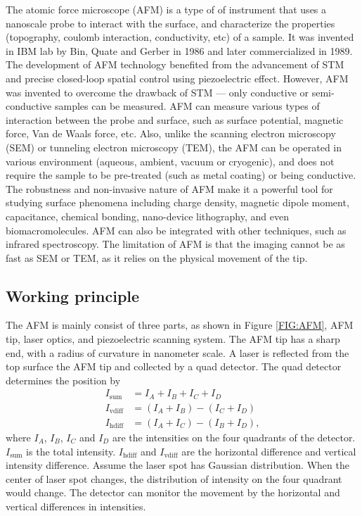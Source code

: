 \documentclass[pdflatex, sectionletters, 12pt]{pittetd}    %
\begin{document}
The atomic force microscope (AFM) is a type of of instrument that uses a nanoscale probe to interact with the surface, and characterize the properties (topography, coulomb interaction, conductivity, etc) of a sample. It was invented in IBM lab by Bin, Quate and Gerber \cite{binning1986atomic} in 1986 and later commercialized in 1989. The development of AFM technology benefited from the advancement of STM and precise closed-loop spatial control using piezoelectric effect. However, AFM was invented to overcome the drawback of STM --- only conductive or semi-conductive samples can be measured. AFM can measure various types of interaction between the probe and surface, such as surface potential, magnetic force, Van de Waals force, etc. Also, unlike the scanning electron microscopy (SEM) or tunneling electron microscopy (TEM), the AFM can be operated in various environment (aqueous, ambient, vacuum or cryogenic), and does not require the sample to be pre-treated (such as metal coating) or being conductive. The robustness and non-invasive nature of AFM make it a powerful tool for studying surface phenomena including charge density, magnetic dipole moment, capacitance, chemical bonding, nano-device lithography, and even biomacromolecules. AFM can also be integrated with other techniques, such as infrared spectroscopy\cite{hammiche1999photothermal, pollock2006handbook}. The limitation of AFM is that the imaging cannot be as fast as SEM or TEM, as it relies on the physical movement of the tip.

\subsection{Working principle}


The AFM is mainly consist of three parts, as shown in Figure \ref{FIG:AFM}, AFM tip, laser optics, and piezoelectric scanning system. The AFM tip has a sharp end, with a radius of curvature in nanometer scale. A laser is reflected from the top surface the AFM tip and collected by a quad detector. The quad detector determines the position by
\begin{equation}
\begin{split}
I_\mathrm{sum} & = I_A + I_B + I_C + I_D \\ 
I_\mathrm{vdiff} & = (I_A + I_B) - (I_C + I_D) \\ 
I_\mathrm{hdiff} & = (I_A + I_C) - (I_B + I_D),
\end{split}
\end{equation}
where $I_A$, $I_B$, $I_C$ and $I_D$ are the intensities on the four quadrants of the detector. $I_\mathrm{sum}$ is the total intensity. $I_\mathrm{hdiff}$ and $I_\mathrm{vdiff}$ are the horizontal difference and vertical intensity difference. Assume the laser spot has Gaussian distribution. When the center of laser spot changes, the distribution of intensity on the four quadrant would change. The detector can monitor the movement by the horizontal and vertical differences in intensities. 
\end{document}
